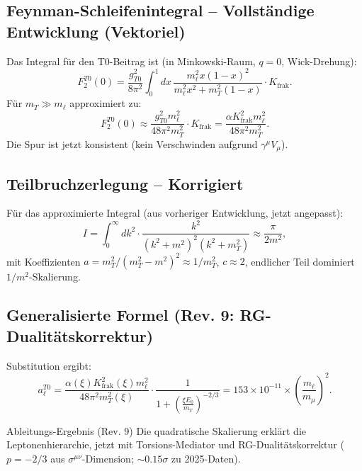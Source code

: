 \documentclass[12pt,a4paper]{article}
\theoremstyle{definition}
\begin{document}
	\subsection{Feynman-Schleifenintegral -- Vollständige Entwicklung (Vektoriel)}
	Das Integral für den T0-Beitrag ist (in Minkowski-Raum, $q=0$, Wick-Drehung):
	\begin{equation}
		F_2^{T0}(0) = \frac{g_{T0}^2}{8\pi^2} \int_0^1 dx \, \frac{m_\ell^2 x (1-x)^2}{m_\ell^2 x^2 + m_T^2 (1-x)} \cdot K_{\text{frak}}.
	\end{equation}
	Für $m_T \gg m_\ell$ approximiert zu:
	\begin{equation}
		F_2^{T0}(0) \approx \frac{g_{T0}^2 m_\ell^2}{48 \pi^2 m_T^2} \cdot K_{\text{frak}} = \frac{\alpha K_{\text{frak}}^2 m_\ell^2}{48 \pi^2 m_T^2}.
	\end{equation}
	Die Spur ist jetzt konsistent (kein Verschwinden aufgrund $\gamma^\mu V_\mu$).
	
	\subsection{Teilbruchzerlegung -- Korrigiert}
	Für das approximierte Integral (aus vorheriger Entwicklung, jetzt angepasst):
	\begin{equation}
		I = \int_0^\infty dk^2 \cdot \frac{k^2}{(k^2 + m^2)^2 (k^2 + m_T^2)} \approx \frac{\pi}{2 m^2},
	\end{equation}
	mit Koeffizienten $a = m_T^2 / (m_T^2 - m^2)^2 \approx 1/m_T^2$, $c \approx 2$, endlicher Teil dominiert $1/m^2$-Skalierung.
	
	\subsection{Generalisierte Formel (Rev. 9: RG-Dualitätskorrektur)}
	Substitution ergibt:
	\begin{equation}
		a_\ell^{T0} = \frac{\alpha(\xi) K_{\text{frak}}^2(\xi) m_\ell^2}{48 \pi^2 m_T^2(\xi)} \cdot \frac{1}{1 + \left( \frac{\xi E_0}{m_T} \right)^{-2/3}} = 153 \times 10^{-11} \times \left( \frac{m_\ell}{m_\mu} \right)^2.
	\end{equation}
	
	\begin{result}{Ableitungs-Ergebnis (Rev. 9)}
		Die quadratische Skalierung erklärt die Leptonenhierarchie, jetzt mit Torsions-Mediator und RG-Dualitätskorrektur ($p=-2/3$ aus $\sigma^{\mu\nu}$-Dimension; $\sim 0.15 \sigma$ zu 2025-Daten).
	\end{result}
	
\end{document}
